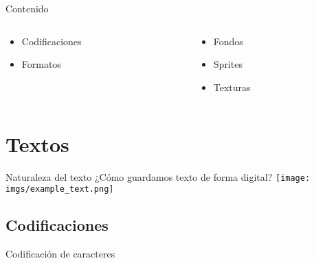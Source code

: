 \begin{frame}{Contenido}
    \begin{columns}
    \begin{column}{0.5\textwidth}
        \begin{itemize}
            \item<2-> Codificaciones
            \item<2-> Formatos
        \end{itemize}
    \end{column}
    \hfill
    \begin{column}{0.5\textwidth}
        \begin{itemize}
            \item<3-> Fondos
            \item<3-> Sprites
            \item<3-> Texturas
        \end{itemize}
        \vfill{}
    \end{column}
    \end{columns}
\end{frame}

\section{Textos}
\begin{frame}{Naturaleza del texto}
    \centering\Large ¿Cómo guardamos texto de forma digital?
    \texttt{[image: imgs/example\_text.png]}
\end{frame}

\subsection{Codificaciones}
\begin{frame}{Codificación de caracteres}
    \centering
\end{frame}

